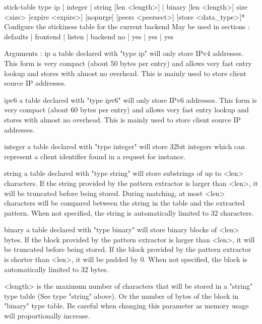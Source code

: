 stick-table type {ip | integer | string [len <length>] | binary [len <length>]}
            size <size> [expire <expire>] [nopurge] [peers <peersect>]
            [store <data_type>]*
  Configure the stickiness table for the current backend
  May be used in sections :   defaults | frontend | listen | backend
                                 no    |    yes   |   yes  |   yes

  Arguments :
    ip         a table declared with "type ip" will only store IPv4 addresses.
               This form is very compact (about 50 bytes per entry) and allows
               very fast entry lookup and stores with almost no overhead. This
               is mainly used to store client source IP addresses.

    ipv6       a table declared with "type ipv6" will only store IPv6 addresses.
               This form is very compact (about 60 bytes per entry) and allows
               very fast entry lookup and stores with almost no overhead. This
               is mainly used to store client source IP addresses.

    integer    a table declared with "type integer" will store 32bit integers
               which can represent a client identifier found in a request for
               instance.

    string     a table declared with "type string" will store substrings of up
               to <len> characters. If the string provided by the pattern
               extractor is larger than <len>, it will be truncated before
               being stored. During matching, at most <len> characters will be
               compared between the string in the table and the extracted
               pattern. When not specified, the string is automatically limited
               to 32 characters.

    binary     a table declared with "type binary" will store binary blocks
               of <len> bytes. If the block provided by the pattern
               extractor is larger than <len>, it will be truncated before
               being stored. If the block provided by the pattern extractor
               is shorter than <len>, it will be padded by 0. When not
               specified, the block is automatically limited to 32 bytes.

    <length>   is the maximum number of characters that will be stored in a
               "string" type table (See type "string" above). Or the number
               of bytes of the block in "binary" type table. Be careful when
               changing this parameter as memory usage will proportionally
               increase.

